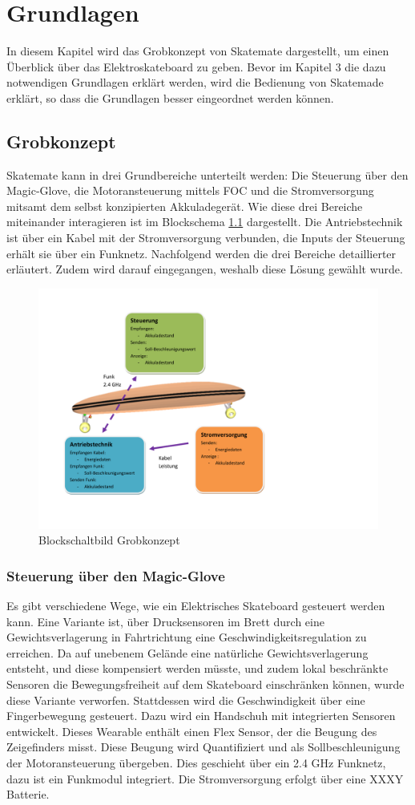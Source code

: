 \chapter{Grundlagen}
In diesem Kapitel wird das Grobkonzept von Skatemate dargestellt, um einen Überblick über das Elektroskateboard zu geben. Bevor im Kapitel 3 die dazu notwendigen Grundlagen erklärt werden, wird die Bedienung von Skatemade erklärt, so dass die Grundlagen besser eingeordnet werden können. 
\section{Grobkonzept}
Skatemate kann in drei Grundbereiche unterteilt werden: Die Steuerung über den Magic-Glove, die Motoransteuerung mittels FOC und die Stromversorgung mitsamt dem selbst konzipierten Akkuladegerät. Wie diese drei Bereiche miteinander interagieren ist im Blockschema \ref{fig:grobkonzeptblockschaltbildgrob}  dargestellt. Die Antriebstechnik ist über ein Kabel mit der Stromversorgung verbunden, die Inputs der Steuerung erhält sie über ein Funknetz. Nachfolgend werden die drei Bereiche detaillierter erläutert. Zudem wird darauf eingegangen, weshalb diese Lösung gewählt wurde. 
\begin{figure}[H]
	\centering
	\includegraphics[width=0.7\linewidth, keepaspectratio]{images/Grobkonzept_Blockschaltbild_grob}
	\caption[Blockschaltbild Grobkonzept]{Blockschaltbild Grobkonzept}
	\label{fig:grobkonzeptblockschaltbildgrob}
\end{figure}

\subsection*{Steuerung über den Magic-Glove}
Es gibt verschiedene Wege, wie ein Elektrisches Skateboard gesteuert werden kann. Eine Variante ist, über Drucksensoren im Brett durch eine Gewichtsverlagerung in Fahrtrichtung eine Geschwindigkeitsregulation zu erreichen. Da auf unebenem Gelände eine natürliche Gewichtsverlagerung entsteht, und diese kompensiert werden müsste, und zudem lokal beschränkte Sensoren die Bewegungsfreiheit auf dem Skateboard einschränken können, wurde diese Variante verworfen. Stattdessen wird die Geschwindigkeit über eine Fingerbewegung gesteuert. Dazu wird ein Handschuh mit integrierten Sensoren entwickelt. Dieses Wearable enthält einen Flex Sensor, der die Beugung des Zeigefinders misst. Diese Beugung wird Quantifiziert und als Sollbeschleunigung der Motoransteuerung übergeben. Dies geschieht über ein 2.4 GHz Funknetz, dazu ist ein Funkmodul integriert. Die Stromversorgung erfolgt über eine XXXY Batterie. 

